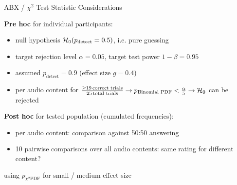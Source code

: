 \documentclass[mathserif]{beamer}
\begin{document}
\begin{frame}{ABX / $\chi^2$ Test Statistic Considerations}


\textbf{Pre hoc} for individual participants:
\begin{itemize}
\item
null hypothesis $\mathcal{H}_{0}(p_\text{detect}=0.5)$, i.e. pure guessing
\item
target rejection level $\alpha=0.05$,
target test power $1-\beta = 0.95$

\item
assumed $p_\text{detect}=0.9$ (effect size $g=0.4$)
\item
per \textcolor{colnonzero}{audio content}
for $\frac{\geq 19\,\text{correct trials}}{25\,\text{total trials}}
\rightarrow p_\text{Binomial PDF}<\frac{\alpha}{5} \rightarrow\mathcal{H}_{0}$
can be rejected
\end{itemize}
%
\vspace{0.25cm}

\textbf{Post hoc} for tested population (cumulated frequencies):

\begin{itemize}
\item per \textcolor{colnonzero}{audio content}: comparison against 50:50 answering
\item 10 pairwise comparisons over all \textcolor{colnonzero}{audio contents}: same rating for different content?
\end{itemize}
using $p_{\chi^2 \text{PDF}}$ for small / medium effect size
\end{frame}
%
%
%
\end{document}
